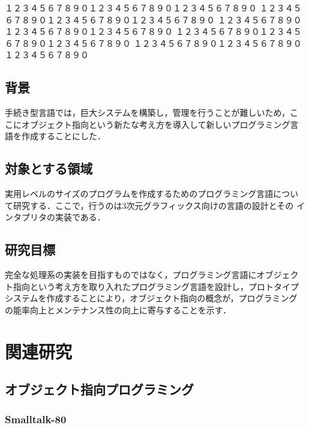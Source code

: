 \documentclass{funthesis}
\begin{document}
１２３４５６７８９０１２３４５６７８９０１２３４５６７８９０
１２３４５６７８９０１２３４５６７８９０１２３４５６７８９０
１２３４５６７８９０１２３４５６７８９０１２３４５６７８９０
１２３４５６７８９０１２３４５６７８９０１２３４５６７８９０
１２３４５６７８９０１２３４５６７８９０１２３４５６７８９０


\section{背景} %


手続き型言語では，巨大システムを構築し，管理を行うことが難しいため，こ
こにオブジェクト指向という新たな考え方を導入して新しいプログラミング言
語を作成することにした．

\section{対象とする領域}

実用レベルのサイズのプログラムを作成するためのプログラミング言語につい
て研究する．ここで，行うのは3次元グラフィックス向けの言語の設計とその
インタプリタの実装である．

\section{研究目標}

完全な処理系の実装を目指すものではなく，プログラミング言語にオブジェク
ト指向という考え方を取り入れたプログラミング言語を設計し，プロトタイプ
システムを作成することにより，オブジェクト指向の概念が，プログラミング
の能率向上とメンテナンス性の向上に寄与することを示す．

\chapter{関連研究}

\section{オブジェクト指向プログラミング}

\subsection{Smalltalk-80} %
\end{document}
